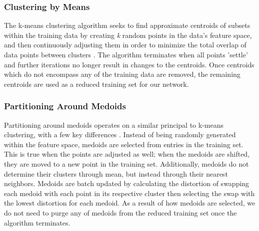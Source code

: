 \subsubsection{Clustering by Means}

The k-means clustering algorithm seeks to find approximate centroids of subsets within the training data by creating \textit{k} random points in the data's feature space, and then continuously adjusting them in order to minimize the total overlap of data points between clusters \citep{Mirkin1996}. The algorithm terminates when all points 'settle' and further iterations no longer result in changes to the centroids. Once centroids which do not encompass any of the training data are removed, the remaining centroids are used as a reduced training set for our network.

\subsubsection{Partitioning Around Medoids}

Partitioning around medoids operates on a similar principal to k-means clustering, with a few key differences \citep{Farcomeni2016}. Instead of being randomly generated within the feature space, medoids are selected from entries in the training set. This is true when the points are adjusted as well; when the medoids are shifted, they are moved to a new point in the training set. Additionally, medoids do not determine their clusters through mean, but instead through their nearest neighbors. Medoids are batch updated by calculating the distortion of swapping each medoid with each point in its respective cluster then selecting the swap with the lowest distortion for each medoid. As a result of how medoids are selected, we do not need to purge any of medoids from the reduced training set once the algorithm terminates.
